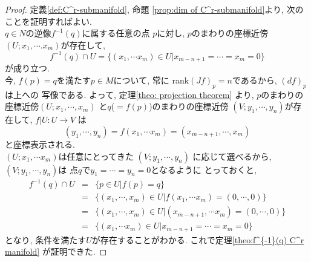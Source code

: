 \documentclass[a4j,12pt]{jarticle}
\theoremstyle{definition}
\begin{document}
\begin{proof}
    定義\ref{def:C^r-submanifold}, 命題
    \ref{prop:dim of C^r-submanifold}より, 
    次のことを証明すればよい.\\ 

    $q\in N$の逆像$f^{-1}(q)$に属する任意の点
    $p$に対し, $p$のまわりの座標近傍
    $(U;x_1,\cdots .x_m)$が存在して, 
    $$f^{-1}(q)\cap U
    =\{(x_1,\cdots x_m)\in U|
    x_{m-n+1}=\cdots =x_m=0\}$$
    が成り立つ. \\

    今, $f(p)=q$を満たす$p\in M$について, 常に
    rank$(Jf)_p=n$であるから, $(df)_p$は上への
    写像である. よって, 定理\ref{theo: projection theorem}
    より, $p$のまわりの座標近傍$(U;x_1,\cdots ,x_m)$
    と$q$($=f(p)$)のまわりの座標近傍
    $(V;y_1,\cdots ,y_n)$が存在して, $f|U:U\to V$
    は
    $$(y_1,\cdots ,y_n)=f(x_1,\cdots x_m)
    =(x_{m-n+1},\cdots ,x_m)$$
    と座標表示される. \\
    $(U;x_1,\cdots x_m)$は任意にとってきた
    $(V;y_1,\cdots ,y_n)$
    に応じて選べるから, $(V;y_1,\cdots ,y_n)$は
    点$q$で$y_1=\cdots =y_n=0$となるように
    とっておくと, 
    \begin{eqnarray*}
        f^{-1}(q)\cap U&=& \{p\in U|f(p)=q\}\\
        &=&\{(x_1,\cdots ,x_m)\in U|f(x_1,\cdots x_m)=(0,\cdots ,0)\}\\
        &=&\{(x_1,\cdots ,x_m)\in U|(x_{m-n+1},\cdots x_m)=(0,\cdots ,0)\}\\
        &=&\{(x_1,\cdots x_m)\in U|x_{m-n+1}=\cdots =x_m=0\}
    \end{eqnarray*}
    となり, 条件を満たす$U$が存在することがわかる. 
    これで定理\ref{theo:f^{-1}(q) C^r manifold}
    が証明できた. 
\end{proof}
\end{document}
